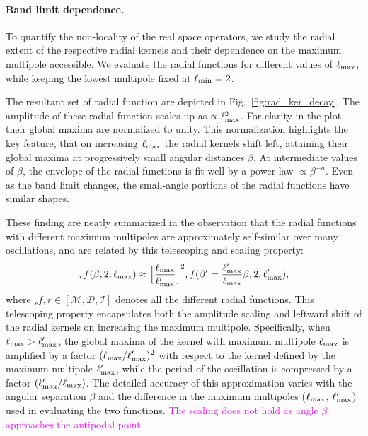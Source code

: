 \documentclass[a4paper,11pt]{article}
\newcommand{\mm}{\mathcal{M}}
\newcommand{\md}{\mathcal{D}}
\newcommand{\mi}{\mathcal{I}}
\def\fig#1{{Fig.~\ref{#1}}}
\newcommand{\rfedit}{\textcolor{magenta}  }
\begin{document}
\paragraph{Band limit dependence.} 
To quantify the non-locality of the real space operators, we study the radial extent of the respective radial kernels and their dependence on the maximum multipole accessible. We evaluate the radial functions for different values of $\ell_{\rm max}$, while keeping the lowest multipole fixed at $\ell_{\rm min}=2$. 

The resultant set of radial function are depicted in \fig{fig:rad_ker_decay}. The amplitude of these radial function scales up as $\propto \ell_{\rm max}^2$.  For clarity in the plot, their global maxima are normalized to unity.  This normalization highlights the key feature, that on increasing $\ell_{\rm max}$ the radial kernels shift left, attaining their global maxima at progressively small angular distances $\beta$.  At intermediate values of $\beta$, the envelope of the radial functions is fit well by a power law $ \propto \beta^{-n}$.  Even as the band limit changes, the small-angle portions of the radial functions have similar shapes.

These finding are neatly summarized in the observation that the radial functions with different maximum multipoles are approximately self-similar over many oscillations, and are related by this telescoping and scaling property:
\begin{equation}{}_rf(\beta,2,\ell_{\rm max}) \approx \Big[\frac{\ell_{\rm max}}{\ell'_{\rm max}}\Big]^2{}_rf(\beta'=\frac{\ell'_{\rm max}}{\ell_{\rm max}} \beta ,2,\ell'_{\rm max}),\end{equation}
where ${}_rf , r \in [\mm, \md,\mi]$ denotes all the different radial functions. This telescoping property encapsulates both the amplitude scaling and leftward shift of the radial kernels on increasing the maximum multipole. {Specifically, when $\ell_{\rm max} > \ell'_{\rm max}$, the global maxima of the kernel with maximum multipole $\ell_{\rm max}$ is amplified by a factor $(\ell_{\rm max}/\ell'_{\rm max})^2$ with respect to the kernel defined by the maximum multipole $\ell'_{\rm max}$, while the period of the oscillation is compressed by a factor $(\ell'_{\rm max}/\ell_{\rm max})$. The detailed accuracy of this approximation varies with the angular separation $\beta$ and the difference in the maximum multipoles ($\ell_{\rm max}$, $\ell'_{\rm max}$)  used in evaluating the two functions.}  \rfedit{The scaling does not hold as angle $\beta$ approaches the antipodal point.}
\end{document}
